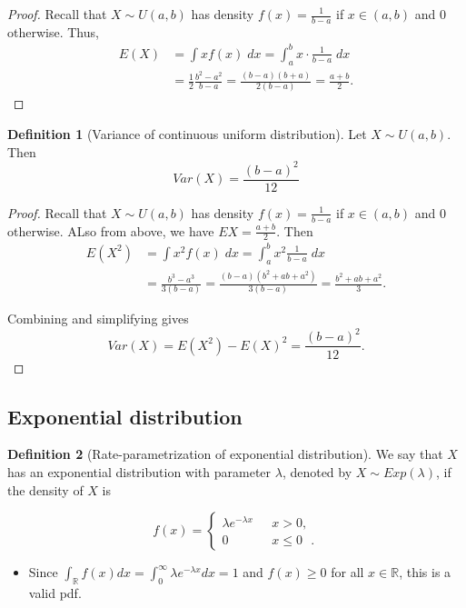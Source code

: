 \documentclass[
]{book}
\providecommand{\tightlist}{%
  \setlength{\itemsep}{0pt}\setlength{\parskip}{0pt}}
\theoremstyle{definition}
\newtheorem{definition}{Definition}[chapter]
\theoremstyle{definition}
\theoremstyle{definition}
\theoremstyle{definition}
\theoremstyle{remark}
\begin{document}
\begin{proof}
Recall that \(X\sim U(a,b)\) has density \(f(x)=\frac{1}{b-a}\) if \(x\in(a,b)\) and 0 otherwise. Thus,
\begin{align*}
 E(X) &= \int x f(x)\; d x = \int_a^b x \cdot \frac{1}{b-a}\;d x \\
 &= \frac{1}{2} \frac{b^2-a^2}{b-a}=\frac{(b-a)(b+a)}{2(b-a)}=\frac{a+b}{2}.\end{align*}
\end{proof}

\begin{definition}[Variance of continuous uniform distribution]
Let \(X\sim U(a,b)\). Then
\[Var(X) = \frac{(b-a)^2}{12}\]
\end{definition}

\begin{proof}
Recall that \(X\sim U(a,b)\) has density \(f(x)=\frac{1}{b-a}\) if \(x\in(a,b)\) and 0 otherwise. ALso from above, we have \(E X =\frac{a + b}{2}\). Then
\begin{align*}
 E(X^2) &= \int x^2 f(x)\;d x = \int_a^b x^2 \frac{1}{b-a}\;d x \\
 &= \frac{b^3-a^3}{3(b-a)}=\frac{(b-a)(b^2+ab+a^2)}{3(b-a)}=\frac{b^2+ab+a^2}{3}.\end{align*}

Combining and simplifying gives
\[ Var(X) = E(X^2)-E(X)^2 = \frac{(b-a)^2}{12}.\]
\end{proof}

\subsection{Exponential distribution}\label{exponential-distribution}

\begin{definition}[Rate-parametrization of exponential distribution]
We say that \(X\) has an exponential distribution with parameter \(\lambda\), denoted by \(X\sim Exp(\lambda)\), if the density of \(X\) is

\[ f(x) =\begin{cases}
      \lambda e ^{- \lambda x} & \mbox{ $x >0$,} \\
      0 & \mbox{ $x \le 0$ }.
   \end{cases}
\]
\end{definition}

\begin{itemize}
\tightlist
\item
  Since \(\int_{\mathbb{R}} f(x) dx = \int_0^\infty \lambda e^{-\lambda x}dx =1\) and \(f(x)\geq 0\) for all \(x\in\mathbb{R}\), this is a valid pdf.
\end{itemize}
\end{document}

